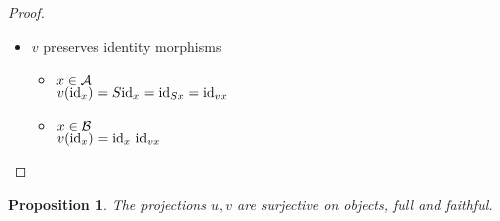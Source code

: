 \documentclass[12pt]{article}
\theoremstyle{plain}
\newtheorem{proposition}[theorem]{Proposition}
\theoremstyle{definition}
\begin{document}
\begin{proof}
\begin{itemize}
\item $v$ preserves identity morphisms
 \begin{itemize}
 \item $ x \in {\cal A}$ \\
$v({\rm id}_{x})=S{\rm id}_{x}={\rm id}_{Sx}={\rm id}_{vx}$
 \item $x \in {\cal B}$ \\
$v({\rm id}_{x})={\rm id}_{x}~{\rm id}_{vx}$
 \end{itemize}
 
\end{itemize}
\end{proof}


\begin{proposition}
The projections $u,v$ are surjective on objects, full and faithful.
\end{proposition}
\end{document}
